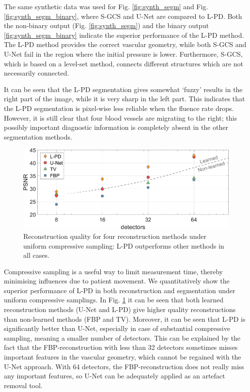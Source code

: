\documentclass[journal]{IEEEtran}
\newcommand{\hl}[1]{\cbcolor{red}\begin{changebar}{\color{red} #1}\end{changebar}}
\begin{document}
\hl{The same synthetic data was used for Fig. \ref{fig:synth_segm} and Fig. \ref{fig:synth_segm_binary}, where S-GCS and U-Net are compared to L-PD. Both the non-binary output (Fig. \ref{fig:synth_segm}) and the binary output \ref{fig:synth_segm_binary} indicate the superior performance of the L-PD method. The L-PD method provides the correct vascular geometry, while both S-GCS and U-Net fail in the region where the initial pressure is lower. Furthermore, S-GCS, which is based on a level-set method, connects different structures which are not necessarily connected.} It can be seen that the L-PD segmentation gives somewhat `fuzzy' results in the right part of the image, while it is very sharp in the left part. This indicates that the L-PD segmentation is pixel-wise less reliable when the fluence rate drops. However, it is still clear that four blood vessels are migrating to the right; this possibly important diagnostic information is completely absent in the other segmentation methods.

\begin{figure}[ht!]
\centering
\includegraphics[width=\linewidth]{images/Paper_resultsuniform_PSNR.png}
\caption{Reconstruction quality for four reconstruction methods under uniform compressive sampling: L-PD outperforms other methods in all cases.}
\label{fig:PSNR_recon}
\end{figure}

Compressive sampling is a useful way to limit measurement time, thereby minimising influences due to patient movement. We quantitatively show the superior performance of L-PD in both reconstruction and segmentation under uniform compressive samplings. In Fig. \ref{fig:PSNR_recon} it can be seen that both learned reconstruction methods (U-Net and L-PD) give higher quality reconstructions than non-learned methods (FBP and TV). Moreover, it can be seen that L-PD is significantly better than U-Net, especially in case of substantial compressive sampling, meaning a smaller number of detectors. This can be explained by the fact that the FBP-reconstruction with less than 32 detectors sometimes misses important features in the vascular geometry, which cannot be regained with the U-Net approach. With 64 detectors, the FBP-reconstruction does not really miss any important features, so U-Net can be adequately applied as an artefact removal tool.  
\end{document}
